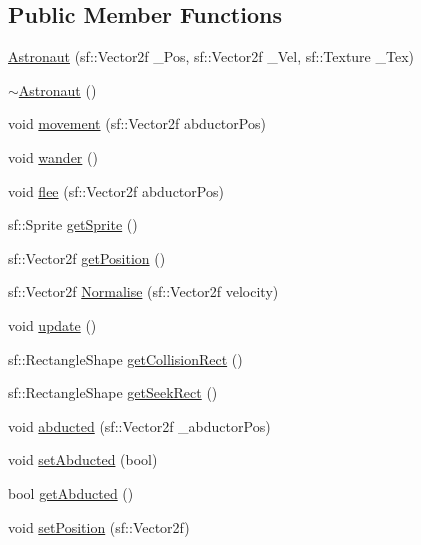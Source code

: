 \subsection*{Public Member Functions}
\begin{DoxyCompactItemize}
\item 
\hyperlink{class_astronaut_ad88a1f14ffa4e13ebc9d996a7def9c74}{Astronaut} (sf\+::\+Vector2f \+\_\+\+Pos, sf\+::\+Vector2f \+\_\+\+Vel, sf\+::\+Texture \+\_\+\+Tex)
\item 
\hyperlink{class_astronaut_af31f9de205719a042df5f0a1879ee064}{$\sim$\+Astronaut} ()
\item 
void \hyperlink{class_astronaut_ab5c332ef51826c5ef2f89fcc72160401}{movement} (sf\+::\+Vector2f abductor\+Pos)
\item 
void \hyperlink{class_astronaut_a39d7e43f8604bf561570e2eb2564a8fa}{wander} ()
\item 
void \hyperlink{class_astronaut_a81199297e80402f219a58a2fff56372c}{flee} (sf\+::\+Vector2f abductor\+Pos)
\item 
sf\+::\+Sprite \hyperlink{class_astronaut_a0fd66ca32a63fde604ddbeadd1a80edc}{get\+Sprite} ()
\item 
sf\+::\+Vector2f \hyperlink{class_astronaut_a3738ff50527c44f089b110ecdb0be2f3}{get\+Position} ()
\item 
sf\+::\+Vector2f \hyperlink{class_astronaut_a9276590bb221f7809f17ebff0a32db36}{Normalise} (sf\+::\+Vector2f velocity)
\item 
void \hyperlink{class_astronaut_acb963c04f91f1cda4aac81f5a51e1f34}{update} ()
\item 
sf\+::\+Rectangle\+Shape \hyperlink{class_astronaut_a5d01978fdd0f00d9adc9769505baa5d5}{get\+Collision\+Rect} ()
\item 
sf\+::\+Rectangle\+Shape \hyperlink{class_astronaut_a59883964bc6a7997885e341918638f80}{get\+Seek\+Rect} ()
\item 
void \hyperlink{class_astronaut_a33359ffc0867f0e6c83a63ed39659848}{abducted} (sf\+::\+Vector2f \+\_\+abductor\+Pos)
\item 
void \hyperlink{class_astronaut_a07d0b1366726e708be3361795a25a1ce}{set\+Abducted} (bool)
\item 
bool \hyperlink{class_astronaut_a531b1ad1af11a0c788a182fa7b71794f}{get\+Abducted} ()
\item 
void \hyperlink{class_astronaut_a2dff61a54b10d5fb38f68d2f63668387}{set\+Position} (sf\+::\+Vector2f)
\end{DoxyCompactItemize}


